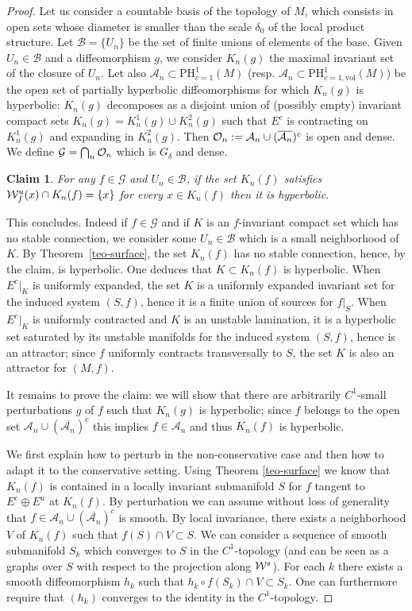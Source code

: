 \documentclass[10pt,a4paper]{amsart}
\numberwithin{equation}{section}     %
\def\cA{\mathcal{A}}  \def\cG{\mathcal{G}} \def\cM{\mathcal{M}} \def\cS{\mathcal{S}}
\def\cB{\mathcal{B}}  \def\cH{\mathcal{H}} \def\cN{\mathcal{N}} \def\cT{\mathcal{T}}
\newtheorem*{af}{Claim}
\begin{document}
\begin{proof}
Let us consider a countable basis of the topology of $M$, which consists in open sets
whose diameter is smaller than the scale  $\delta_0$ of the local product structure.
Let $\cB= \{U_n\}$ be the set of finite unions of elements of the base. Given $U_n \in \cB$
and a diffeomorphism $g$, we consider $K_n(g)$ the maximal invariant set of the closure of $U_n$. Let also $\cA_n \subset \mathrm{PH}^1_{c=1}(M)$ (resp. $\cA_n \subset \mathrm{PH}^1_{c=1,\mathrm{vol}}(M)$) be the open set of partially hyperbolic diffeomorphisms for which $K_n(g)$ is hyperbolic: $K_n(g)$ decomposes as a disjoint union of (possibly empty) invariant compact sets $K_n(g)=K_n^1(g) \cup K_n^2(g)$ such that $E^c$ is contracting on $K_n^1(g)$ and expanding in $K_n^2(g)$. Then $\cO_n := \cA_n \cup (\overline{\cA_n})^c$ is open and dense. We define $\cG = \bigcap_n \cO_n$ which is $G_\delta$ and dense.

\begin{af}
For any $f \in \cG$ and $U_n \in \cB$, if the set $K_n(f)$ satisfies $\mathcal{W}^u_f(x) \cap K_n(f) = \{x\}$ for every $x \in K_n(f)$ then it is hyperbolic.
\end{af}

This concludes. Indeed if $f \in \cG$ and if $K$ is an $f$-invariant compact set which has no stable connection, we consider some $U_n\in \cB$ which is a small neighborhood of $K$.
By Theorem~\ref{teo-surface}, the set $K_n(f)$ has no stable connection, hence, by the claim, is hyperbolic. One deduces that $K\subset K_n(f)$ is hyperbolic.
When $E^c|_K$ is uniformly expanded,
the set $K$ is a uniformly expanded invariant set for the induced system $(S,f)$,
hence it is a finite union of sources for $f|_S$.
When $E^c|_K$ is uniformly contracted and $K$ is an unstable lamination,
it is a hyperbolic set saturated by its unstable manifolds for the induced system $(S,f)$,
hence is an attractor; since $f$ uniformly contracts transversally to $S$, the set $K$
is also an attractor for $(M,f)$.

\smallskip

It remains to prove the claim: we will show that there are arbitrarily $C^1$-small perturbations $g$ of $f$ such that $K_n(g)$ is hyperbolic; since $f$ belongs to the open set  $\cA_n \cup (\overline{\cA_n})^c$ this implies $f \in \cA_n$ and thus $K_n(f)$ is hyperbolic.

We first explain how to perturb in the non-conservative case and then how to adapt it to the conservative setting. Using Theorem \ref{teo-surface} we know that $K_n(f)$ is contained in a locally invariant submanifold $S$ for $f$ tangent to $E^c \oplus E^u$ at $K_n(f)$. By perturbation we can assume without loss of generality that $f\in \cA_n \cup (\overline{\cA_n})^c$ is smooth. By local invariance, there exists a neighborhood $V$ of $K_n(f)$ such that $f(S)\cap V\subset S$.
We can consider a sequence of smooth submanifold $S_k$ which converges to $S$ in the $C^1$-topology (and can be seen as a graphs over $S$ with respect to the projection along $\mathcal{W}^s$). For each $k$ there exists a smooth diffeomorphism $h_k$ such that $h_k\circ f(S_k)\cap V\subset S_k$. One can furthermore require that $(h_k)$ converges to the identity in the $C^1$-topology.


\end{proof}
\end{document}
